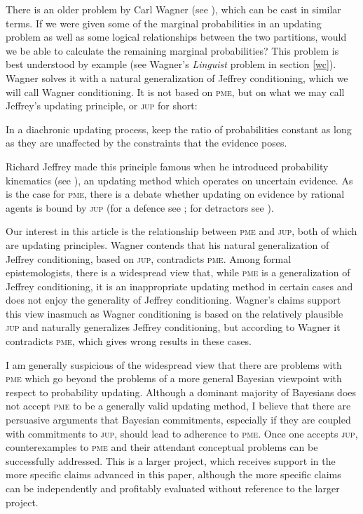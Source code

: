 \documentclass[11pt]{article}
\begin{document}
There is an older problem by Carl Wagner (see ),
which can be cast in similar terms. If we were given some of the
marginal probabilities in an updating problem as well as some logical
relationships between the two partitions, would we be able to
calculate the remaining marginal probabilities? This problem is best
understood by example (see Wagner's \emph{Linguist} problem in section
\ref{wc}). Wagner solves it with a natural generalization of
Jeffrey conditioning, which we will call Wagner conditioning. It is
not based on \textsc{pme}, but on what we may call Jeffrey's
updating principle, or \textsc{jup} for short:

\begin{quotex}
   In a diachronic updating process, keep the ratio of
  probabilities constant as long as they are unaffected by the
  constraints that the evidence poses.
\end{quotex}

Richard Jeffrey made this principle famous when he introduced
probability kinematics (see ), an updating
method which operates on uncertain evidence. As is the case for
\textsc{pme}, there is a debate whether updating on evidence by
rational agents is bound by \textsc{jup} (for a defence see
; for detractors see
). 

Our interest in this article is the relationship between \textsc{pme}
and \textsc{jup}, both of which are updating principles. Wagner
contends that his natural generalization of Jeffrey conditioning,
based on \textsc{jup}, contradicts \textsc{pme}. Among formal
epistemologists, there is a widespread view that, while \textsc{pme}
is a generalization of Jeffrey conditioning, it is an inappropriate
updating method in certain cases and does not enjoy the generality of
Jeffrey conditioning. Wagner's claims support this view inasmuch as
Wagner conditioning is based on the relatively plausible \textsc{jup}
and naturally generalizes Jeffrey conditioning, but according to
Wagner it contradicts \textsc{pme}, which gives wrong results in these
cases.

I am generally suspicious of the widespread view that there are
problems with \textsc{pme} which go beyond the problems of a more
general Bayesian viewpoint with respect to probability updating.
Although a dominant majority of Bayesians does not accept \textsc{pme}
to be a generally valid updating method, I believe that there are
persuasive arguments that Bayesian commitments, especially if they are
coupled with commitments to \textsc{jup}, should lead to adherence to
\textsc{pme}. Once one accepts \textsc{jup}, counterexamples to
\textsc{pme} and their attendant conceptual problems can be
successfully addressed. This is a larger project, which receives
support in the more specific claims advanced in this paper, although
the more specific claims can be independently and profitably evaluated
without reference to the larger project.
\end{document}
